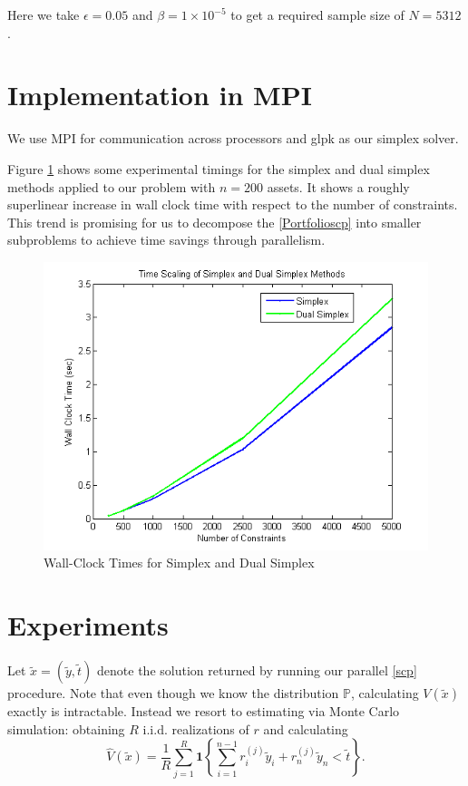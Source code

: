 \documentclass[12pt]{article}
\begin{document}
Here we take $\epsilon = 0.05$ and $\beta = 1 \times 10^{-5}$ to get a required sample size of $N = 5312$.

\section*{Implementation in MPI}

We use MPI for communication across processors and glpk as our simplex solver.


Figure \ref{fig:fig_simplex_time} shows some experimental timings for the simplex and dual simplex methods applied to our problem with $n = 200$ assets.
It shows a roughly superlinear increase in wall clock time with respect to the number of constraints.
This trend is promising for us to decompose the \ref{Portfolioscp} into smaller subproblems to achieve time savings through parallelism.

\begin{figure}[ht]
	\centering
		\includegraphics{../plot/figs/fig_simplex_time.png}
	\caption{Wall-Clock Times for Simplex and Dual Simplex}
	\label{fig:fig_simplex_time}
\end{figure}


\section*{Experiments}
Let $\tilde{x} = (\tilde{y}, \tilde{t})$ denote the solution returned by running our parallel \ref{scp} procedure.
Note that even though we know the distribution $\mathbb{P}$, calculating $V(\tilde{x})$ exactly is intractable.
Instead we resort to estimating via Monte Carlo simulation: obtaining $R$ i.i.d. realizations of $r$ and calculating
\[ \hat{V}(\tilde{x}) = \frac{1}{R} \sum_{j = 1}^R \mathbf{1}\left\{ \sum_{i=1}^{n-1} r_i^{(j)} \tilde{y}_i + r_n^{(j)} \tilde{y}_n < \tilde{t}\right\}. \]
\end{document}
